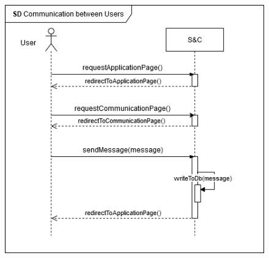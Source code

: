 \begin{enumerate}[label=\textbf{[US\arabic*]}, left = 0pt, align = left, resume]
            \newpage
            \begin{figure}[h!]
                \centering  \includegraphics[width=1\textwidth]{RASD/Images/UseCases/US17_CommunicationBetweenUsers.drawio.png}
                \label{fig:example}
            \end{figure}

        \end{enumerate}

    \newpage
